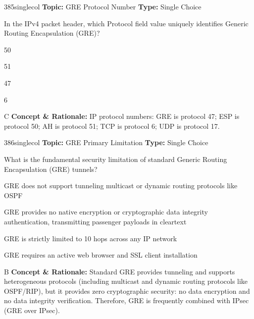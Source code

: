 \begin{qcard}{385}{singlecol}
\textcolor{darkslate!75}{\small\textbf{Topic:} GRE Protocol Number \hfill \textbf{Type:} Single Choice}\vspace{0.4em}\par
In the IPv4 packet header, which Protocol field value uniquely identifies Generic Routing Encapsulation (GRE)?
\begin{qoptions}
\item 50
\item 51
\item 47
\item 6
\end{qoptions}
\end{qcard}
\nopagebreak
\begin{explainbox}{C}
\textbf{Concept \& Rationale:} IP protocol numbers: GRE is protocol 47; ESP is protocol 50; AH is protocol 51; TCP is protocol 6; UDP is protocol 17.
\end{explainbox}

\begin{qcard}{386}{singlecol}
\textcolor{darkslate!75}{\small\textbf{Topic:} GRE Primary Limitation \hfill \textbf{Type:} Single Choice}\vspace{0.4em}\par
What is the fundamental security limitation of standard Generic Routing Encapsulation (GRE) tunnels?
\begin{qoptions}
\item GRE does not support tunneling multicast or dynamic routing protocols like OSPF
\item GRE provides no native encryption or cryptographic data integrity authentication, transmitting passenger payloads in cleartext
\item GRE is strictly limited to 10 hops across any IP network
\item GRE requires an active web browser and SSL client installation
\end{qoptions}
\end{qcard}
\nopagebreak
\begin{explainbox}{B}
\textbf{Concept \& Rationale:} Standard GRE provides tunneling and supports heterogeneous protocols (including multicast and dynamic routing protocols like OSPF/RIP), but it provides zero cryptographic security: no data encryption and no data integrity verification. Therefore, GRE is frequently combined with IPsec (GRE over IPsec).
\end{explainbox}

